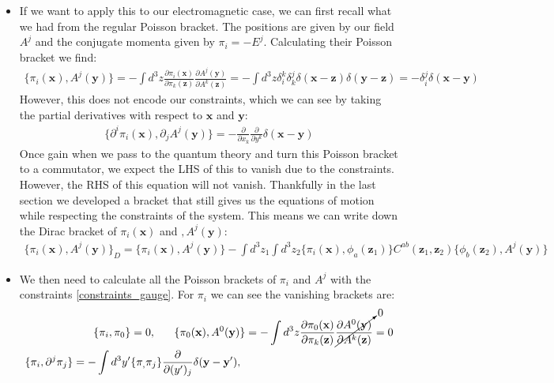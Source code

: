 \documentclass[11pt]{article}
\numberwithin{equation}{section}
\begin{document}
\begin{itemize}
  \item If we want to apply this to our electromagnetic case, we can first recall what we had from the regular Poisson bracket. The positions are given by our field $A^j$ and the conjugate momenta given by $\pi_i = -E^j$. Calculating their Poisson bracket we find:
  \begin{align*}
     \{\pi_i(\textbf{x}),A^j(\textbf{y})\} = -\int d^3z\frac{\partial \pi_i(\textbf{x})}{\partial \pi_k(\textbf{z})}\frac{\partial A^j(\textbf{y})}{\partial A^k(\textbf{z})} = -\int d^3z \delta^{k}_i\delta^j_k\delta(\textbf{x}-\textbf{z})\delta(\textbf{y}-\textbf{z}) = -\delta^j_i\delta(\textbf{x}-\textbf{y})
   \end{align*} 
   However, this does not encode our constraints, which we can see by taking the partial derivatives with respect to $\textbf{x}$ and $\textbf{y}$:
   \begin{align*}
        \{\partial^i\pi_i(\textbf{x}),\partial_jA^j(\textbf{y})\} = -\frac{\partial}{\partial x_k}\frac{\partial}{\partial y^k}\delta(\textbf{x}-\textbf{y})
  \end{align*}  
  Once gain when we pass to the quantum theory and turn this Poisson bracket to a commutator, we expect the LHS of this to vanish due to the constraints. However, the RHS of this equation will not vanish. Thankfully in the last section we developed a bracket that still gives us the equations of motion while respecting the constraints of the system. This means we can write down the Dirac bracket of $\pi_i(\textbf{x}) $ and $,A^j(\textbf{y})$:
  \begin{align}
  \label{QED_dirac}
    \{\pi_i(\textbf{x}),A^j(\textbf{y})\}_D  = \{\pi_i(\textbf{x}),A^j(\textbf{y})\}-\int d^3z_1\int d^3z_2\{\pi_i(\textbf{x}),\phi_a(\textbf{z}_1)\}C^{ab}(\textbf{z}_1,\textbf{z}_2)\{\phi_b(\textbf{z}_2),A^j(\textbf{y})\}
  \end{align}
  \item We then need to calculate all the Poisson brackets of $\pi_i$ and $A^{j}$ with the constraints \ref{constraints_gauge}. For $\pi_i$ we can see the vanishing brackets are:
  \begin{align*}
    \{\pi_i,\pi_0\} &= 0, ~~~~~
    \{\pi_0(\textbf{x}),A^0(\textbf{y})\} = -\int d^3z \frac{\partial \pi_0(\textbf{x})}{\partial \pi_k(\textbf{z})}\cancelto{0}{\frac{\partial A^0(\textbf{y})}{\partial A^k(\textbf{z})}} =0 \\
    \{\pi_i,\partial^j\pi_j \}  = -\int d^3y'&\{\pi_,\pi_j\}\frac{\partial}{\partial(y')_j}\delta(\textbf{y}-\textbf{y}'),~~~~~

\end{align*}
\end{itemize}
\end{document}
